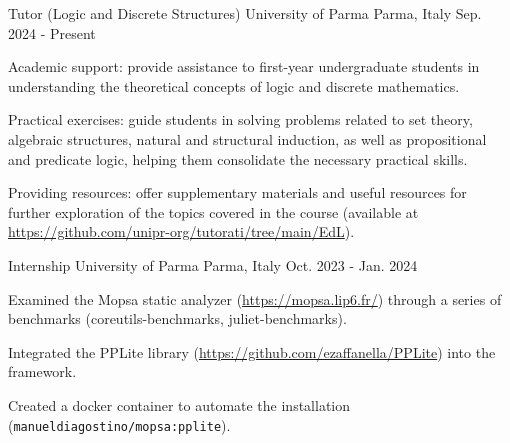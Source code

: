 

\begin{cventries}

	\cventry
	{Tutor (Logic and Discrete Structures)} %
	{University of Parma} %
	{Parma, Italy} %
	{Sep. 2024 - Present} %
	{
	\begin{cvitems} %
		\item Academic support: provide assistance to first-year undergraduate students in understanding the theoretical concepts of logic and discrete mathematics. 
		\item Practical exercises: guide students in solving problems related to set theory, algebraic structures, natural and structural induction, as well as propositional and predicate logic, helping them consolidate the necessary practical skills.
		\item Providing resources: offer supplementary materials and useful resources for further exploration of the topics covered in the course (available at \url{https://github.com/unipr-org/tutorati/tree/main/EdL}).
	\end{cvitems}
	}

	\cventry
	{Internship} %
	{University of Parma} %
	{Parma, Italy} %
	{Oct. 2023 - Jan. 2024} %
	{
	\begin{cvitems} %
		\item {Examined the Mopsa static analyzer (\url{https://mopsa.lip6.fr/}) through a series of benchmarks (coreutils-benchmarks, juliet-benchmarks).}
		\item {Integrated the PPLite library (\url{https://github.com/ezaffanella/PPLite}) into the framework.}
		\item {Created a docker container to automate the installation (\texttt{manueldiagostino/mopsa:pplite}).}
	\end{cvitems}
	}

\end{cventries}

